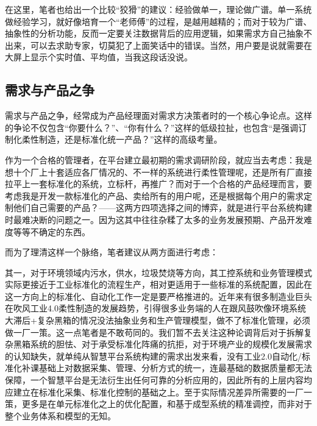 \documentclass[
]{book}
\begin{document}
在这里，笔者也给出一个比较``狡猾''的建议：经验做单一，理论做广谱。单一系统做经验学习，就好像培育一个``老师傅''的过程，是越用越精的；而对于较为广谱、抽象性的分析功能，反而一定要关注数据背后的应用逻辑，如果需求方自己抽象不出来，可以去求助专家，切莫犯了上面笑话中的错误。当然，用户要是说就需要在大屏上显示个实时值、平均值，当我这段话没说。

\hypertarget{ux9700ux6c42ux4e0eux4ea7ux54c1ux4e4bux4e89}{%
\subsection{需求与产品之争}\label{ux9700ux6c42ux4e0eux4ea7ux54c1ux4e4bux4e89}}

需求与产品之争，经常成为产品经理面对需求方决策者时的一个核心争论点。这样的争论不仅包含``你要什么？''、``你有什么？''这样的低级拉扯，也包含``是强调订制化柔性制造，还是标准化统一产品？''这样的高级考量。

作为一个合格的管理者，在平台建立最初期的需求调研阶段，就应当去考虑：我是想十个厂上十套适应各厂情况的、不一样的系统进行柔性管理呢，还是所有厂直接拉平上一套标准化的系统，立标杆，再推广？而对于一个合格的产品经理而言，要考虑我是开发一款标准化的产品、卖给所有的用户呢，还是根据每个用户的需求定制他们自己需要的产品？------这两方四项选择之间的博弈，就是进行平台系统构建时最难决断的问题之一。因为这其中往往杂糅了太多的业务发展预期、产品开发难度等等不确定的东西。

而为了理清这样一个脉络，笔者建议从两方面进行考虑：

其一，对于环境领域内污水，供水，垃圾焚烧等方向，其工控系统和业务管理模式实际更接近于工业标准化的流程生产，相对更适用于一些标准的系统配置，因此在这一方向上的标准化、自动化工作一定是要严格推进的。近年来有很多制造业巨头在吹风工业4.0柔性制造的发展趋势，引得很多业务端的人在跟风鼓吹像环境系统大滞后+复杂黑箱的情况没法抽象业务和生产管理模型，做不了标准化管理，必须做一厂一策。这一点笔者是不敢苟同的。我们暂不去关注这种论调背后对于拆解复杂黑箱系统的胆怯、对于承受标准化阵痛的抗拒，对于环境产业的规模化发展需求的认知缺失，就单纯从智慧平台系统构建的需求出发来看，没有工业2.0自动化/标准化补课基础上对数据采集、管理、分析方式的统一，连最基础的数据质量都无法保障，一个智慧平台是无法衍生出任何可靠的分析应用的，因此所有的上层内容均应建立在标准化采集、标准化控制的基础之上。至于实际情况差异所需要的一厂一策，更多是在单元标准化之上的优化配置，和基于成型系统的精准调控，而非对于整个业务体系和模型的无知。
\end{document}
